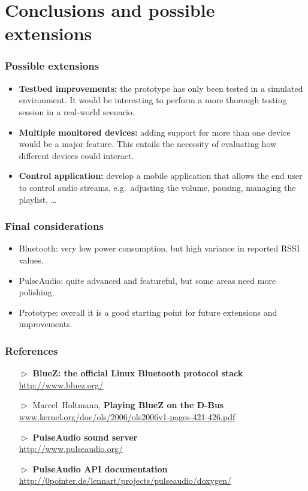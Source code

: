 \documentclass{beamer}
\begin{document}

\section[Conclusions]{Conclusions and possible extensions}

\begin{frame}
\frametitle{Possible extensions}
\begin{itemize}
	\item \textbf{Testbed improvements:} the prototype has only been tested in a simulated environment. It would be interesting to perform a more thorough testing session in a real-world scenario.
	\pause
	\item \textbf{Multiple monitored devices:} adding support for more than one device would be a major feature. This entails the necessity of evaluating how different devices could interact.
	\pause
	\item \textbf{Control application:} develop a mobile application that allows the end user to control audio streams, e.g.\ adjusting the volume, pausing, managing the playlist, \ldots
\end{itemize}
\end{frame}

\begin{frame}
\frametitle{Final considerations}
\begin{itemize}
\setlength{\itemsep}{5mm}
	\item Bluetooth: very low power consumption, but high variance in reported RSSI values.
	\item PulseAudio: quite advanced and featureful, but some areas need more polishing.
	\item Prototype: overall it is a good starting point for future extensions and improvements.
\end{itemize}
\end{frame}


\appendix

\begin{frame}
\frametitle{References}
\begin{itemize}
	\item[$\vartriangleright$] \textbf{BlueZ: the official Linux Bluetooth protocol stack} \\
			{\footnotesize\url{http://www.bluez.org/}}
	\item[$\vartriangleright$] Marcel~Holtmann, \textbf{Playing BlueZ on the D-Bus} \\
			{\footnotesize\url{www.kernel.org/doc/ols/2006/ols2006v1-pages-421-426.pdf}}
	\item[$\vartriangleright$] \textbf{PulseAudio sound server} \\
			{\footnotesize\url{http://www.pulseaudio.org/}}
	\item[$\vartriangleright$] \textbf{PulseAudio API documentation} \\
			{\footnotesize\url{http://0pointer.de/lennart/projects/pulseaudio/doxygen/}}
\end{itemize}
\end{frame}
\end{document}
